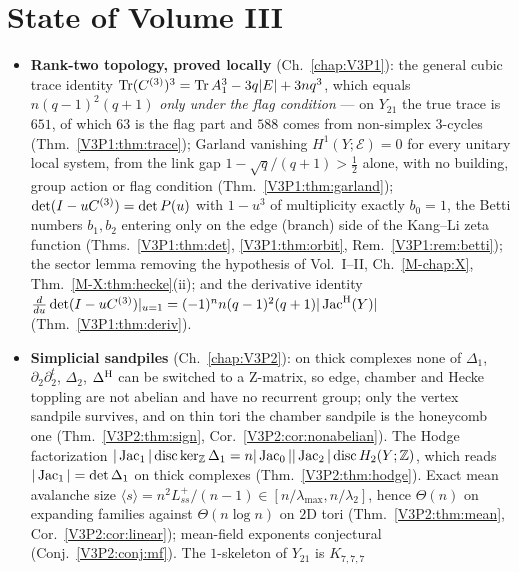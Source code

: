 ﻿%
\chapter*{State of Volume III}

\begin{itemize}
\item \textbf{Rank-two topology, proved locally} (Ch.~\ref{chap:V3P1}): the general cubic
trace identity $\operatorname{Tr}(C^{(3)})^{3}=\operatorname{Tr} A_1^{3}-3q|E|+3nq^{3}$, which equals $n(q-1)^{2}(q+1)$
\emph{only under the flag condition} --- on $Y_{21}$ the true trace is $651$, of which $63$
is the flag part and $588$ comes from non-simplex $3$-cycles
(Thm.~\ref{V3P1:thm:trace}); Garland vanishing $H^{1}(Y;\mathcal E)=0$ for every unitary
local system, from the link gap $1-\sqrt q/(q+1)>\tfrac12$ alone, with no building, group
action or flag condition (Thm.~\ref{V3P1:thm:garland}); $\det(I-uC^{(3)})=\det P(u)$ with
$1-u^{3}$ of multiplicity exactly $b_0=1$, the Betti numbers $b_1,b_2$ entering only on the
edge (branch) side of the Kang--Li zeta function (Thms.~\ref{V3P1:thm:det},
\ref{V3P1:thm:orbit}, Rem.~\ref{V3P1:rem:betti}); the sector lemma removing the hypothesis
of Vol.~I--II, Ch.~\ref{M-chap:X}, Thm.~\ref{M-X:thm:hecke}(ii); and the derivative identity
$\frac{d}{du}\det(I-uC^{(3)})|_{u=1}=(-1)^{n}n(q-1)^{2}(q+1)|\operatorname{Jac}^{\mathrm{H}}(Y)|$
(Thm.~\ref{V3P1:thm:deriv}).
\item \textbf{Simplicial sandpiles} (Ch.~\ref{chap:V3P2}): on thick complexes none of
$\Delta_1$, $\partial_2\partial_2^{t}$, $\Delta_2$, $\Delta^{\mathrm{H}}$ can be switched to a Z-matrix, so
edge, chamber and Hecke toppling are not abelian and have no recurrent group; only the
vertex sandpile survives, and on thin tori the chamber sandpile is the honeycomb one
(Thm.~\ref{V3P2:thm:sign}, Cor.~\ref{V3P2:cor:nonabelian}). The Hodge factorization
$|\operatorname{Jac}_1|\operatorname{disc}\ker_{\mathbb{Z}}\Delta_1=n|\operatorname{Jac}_0||\operatorname{Jac}_2|\operatorname{disc}H_2(Y;\mathbb{Z})$,
which reads $|\operatorname{Jac}_1|=\det\Delta_1$ on thick complexes (Thm.~\ref{V3P2:thm:hodge}). Exact
mean avalanche size $\langle s\rangle=n^{2}L^{+}_{ss}/(n-1)\in[n/\lambda_{\max},n/\lambda_2]$,
hence $\Theta(n)$ on expanding families against $\Theta(n\log n)$ on $2$D tori
(Thm.~\ref{V3P2:thm:mean}, Cor.~\ref{V3P2:cor:linear}); mean-field exponents conjectural
(Conj.~\ref{V3P2:conj:mf}). The $1$-skeleton of $Y_{21}$ is $K_{7,7,7}$

\end{itemize}
